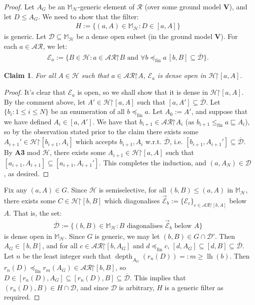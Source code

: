 \documentclass[11pt,reqno]{amsart}
\theoremstyle{plain}
\numberwithin{equation}{section}
\newtheorem{claim}{Claim}
\theoremstyle{definition}
\newcommand{\func}{\operatorname}
\renewcommand{\bar}[1]{\overline{#1}}
\newcommand{\cal}{\mathcal}
\renewcommand{\bf}{\mathbf}
\newcommand{\restrictedto}{\mathord{\upharpoonright}}
\newcommand{\V}{\bf{V}}
\renewcommand{\H}{\cal{H}}
\newcommand{\lh}{\func{lh}}
\newcommand{\depth}{\func{depth}}
\newcommand{\fin}{\mathrm{fin}}
\newcommand{\D}{\cal{D}}
\newcommand{\E}{\cal{E}}
\newenvironment{midproof}[1][Proof]
  {\begin{proof}[#1]\renewcommand{\qedsymbol}{$\blacksquare$}}
  {\end{proof}}
\begin{document}
\begin{proof}
    Let $A_G$ be an $\mathbb{M}_\H$-generic element of $\cal{R}$ (over some ground model $\V$), and let $D \leq A_G$. We need to show that the filter: 
    \begin{align*}
        H := \{(a,A) \in \mathbb{M}_\H : D \in [a,A]\}
    \end{align*}
    is generic. Let $\D \subseteq \mathbb{M}_\H$ be a dense open subset (in the ground model $\V$). For each $a \in \cal{AR}$, we let:
    \begin{align*}
        \E_a := \{B \in \H : a \in \cal{AR}\restrictedto B \text{ and } \forall b \preceq_\fin a \, [b,B] \subseteq \bar{\D}\}.
    \end{align*} 

    \begin{claim}
        For all $A \in \H$ such that $a \in \cal{AR}\restrictedto A$, $\E_a$ is dense open in $\H\restrictedto[a,A]$.
    \end{claim}

    \begin{midproof}
        It's clear that $\E_a$ is open, so we shall show that it is dense in $\H\restrictedto[a,A]$. By the comment above, let $A' \in \H\restrictedto[a,A]$ such that $[a,A'] \subseteq \bar{\D}$. Let $\{b_i : 1 \leq i \leq N\}$ be an enumeration of all $b \preceq_\fin a$. Let $A_0 := A'$, and suppose that we have defined $A_i \in [a,A']$. We have that $b_{i+1} \in \cal{AR}\restrictedto A_i$ (as $b_{i+1} \leq_\fin a \sqsubseteq A_i$), so by the observation stated prior to the claim there exists some $A_{i+1}' \in \H\restrictedto[b_{i+1},A_i]$ which accepts $b_{i+1},A_i$ w.r.t. $\bar{\D}$, i.e. $[b_{i+1},A_{i+1}'] \subseteq \bar{\D}$. By \textbf{A3} mod $\H$, there exists some $A_{i+1} \in \H\restrictedto[a,A]$ such that $[a_{i+1},A_{i+1}] \subseteq [a_{i+1},A_{i+1}']$. This completes the induction, and $(a,A_N) \in \D$, as desired. 
    \end{midproof}

    Fix any $(a,A) \in G$. Since $\H$ is semiselective, for all $(b,B) \leq (a,A)$ in $\mathbb{M}_\H$, there exists some $C \in \H\restrictedto[b,B]$ which diagonalises $\vec{\E}_b := \{\E_c\}_{c\in\cal{AR}\restrictedto[b,A]}$ below $A$. That is, the set:
    \begin{align*}
        \bar{\D} := \{(b,B) \in \mathbb{M}_\H : \text{$B$ diagonalises $\vec{\E}_b$ below $A$}\}
    \end{align*}
    is dense open in $\mathbb{M}_\H$. Since $G$ is generic, we may let $(b,B) \in G \cap \D'$. Then $A_G \in [b,B]$, and for all $c \in \cal{AR}\restrictedto[b,A_G]$ and $d \preceq_\fin c$, $[d,A_G] \subseteq [d,B] \subseteq \bar{\D}$. Let $n$ be the least integer such that $\depth_{A_G}(r_n(D)) =: m \geq \lh(b)$. Then $r_n(D) \preceq_\fin r_m(A_G) \in \cal{AR}\restrictedto[b,B]$, so $D \in [r_n(D),A_G] \subseteq [r_n(D),B] \subseteq \bar{\D}$. This implies that $(r_n(D),B) \in H \cap \D$, and since $\D$ is arbitrary, $H$ is a generic filter as required.
\end{proof}
\end{document}
